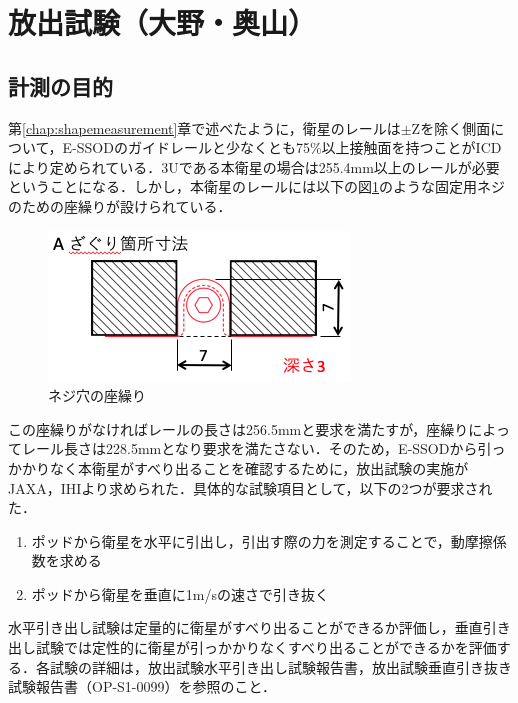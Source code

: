\section{放出試験（大野・奥山）}
\label{chap:ejectiontest}

\subsection{計測の目的}

第\ref{chap:shapemeasurement}章で述べたように，衛星のレールは$\pm$Zを除く側面について，E-SSODのガイドレールと少なくとも75\%以上接触面を持つことがICDにより定められている．3Uである本衛星の場合は255.4mm以上のレールが必要ということになる．しかし，本衛星のレールには以下の図\ref{fig:hole}のような固定用ネジのための座繰りが設けられている．

\begin{figure}[h]
	\begin{center}
		
		\includegraphics[width=0.6\linewidth]{04/fig/hole.png}
		\caption{ネジ穴の座繰り}
		\label{fig:hole}
		
	\end{center}
\end{figure}

この座繰りがなければレールの長さは256.5mmと要求を満たすが，座繰りによってレール長さは228.5mmとなり要求を満たさない．そのため，E-SSODから引っかかりなく本衛星がすべり出ることを確認するために，放出試験の実施がJAXA，IHIより求められた．具体的な試験項目として，以下の2つが要求された．

\begin{enumerate}
	\item ポッドから衛星を水平に引出し，引出す際の力を測定することで，動摩擦係数を求める
	\item ポッドから衛星を垂直に1m/sの速さで引き抜く
\end{enumerate}

水平引き出し試験は定量的に衛星がすべり出ることができるか評価し，垂直引き出し試験では定性的に衛星が引っかかりなくすべり出ることができるかを評価する．各試験の詳細は，放出試験水平引き出し試験報告書，放出試験垂直引き抜き試験報告書（OP-S1-0099）を参照のこと．

